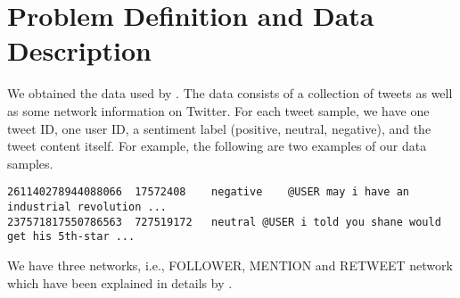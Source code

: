 
\section{Problem Definition and Data Description}
We obtained the data used by \cite{yang2017attention}. The data consists of a collection of tweets as well as some network information on Twitter. For each tweet sample, we have one tweet ID, one user ID, a sentiment label (positive, neutral, negative), and the tweet content itself. For example, the following are two examples of our data samples.
\begin{verbatim}
261140278944088066	17572408	negative	@USER may i have an industrial revolution ...
237571817550786563	727519172	neutral	@USER i told you shane would get his 5th-star ...
\end{verbatim}
We have three networks, i.e., FOLLOWER, MENTION and RETWEET network which have been explained in details by
\cite{yang2017attention}.
